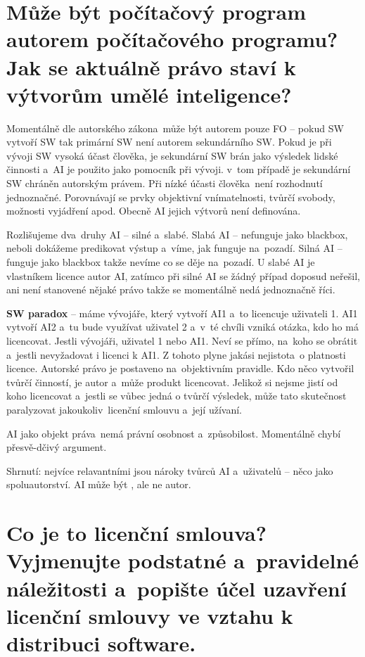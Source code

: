 \section{Může být počítačový program autorem počítačového programu? Jak se aktuálně právo staví k výtvorům umělé inteligence?}

Momentálně dle autorského zákona~může být autorem pouze FO -- pokud SW vytvoří SW tak primární SW není autorem sekundárního SW. Pokud je při vývoji SW vysoká účast člověka, je sekundární SW brán jako výsledek lidské činnosti a~AI je použito jako pomocník při vývoji. v~tom případě je sekundární SW chráněn autorským právem. Při nízké účasti člověka~není rozhodnutí jednoznačné. Porovnávají se prvky objektivní vnímatelnosti, tvůrčí svobody, možnosti vyjádření apod. Obecně AI jejich výtvorů není definována.

Rozlišujeme dva~druhy AI -- silné a~slabé. Slabá AI -- nefunguje jako blackbox, neboli dokážeme predikovat výstup a~víme, jak funguje na~pozadí. Silná AI -- funguje jako blackbox takže nevíme co se děje na~pozadí. U slabé AI je vlastníkem licence autor AI, zatímco při silné AI se žádný případ doposud neřešil, ani není stanovené nějaké právo takže se momentálně nedá jednoznačně říci.

\textbf{SW paradox} -- máme vývojáře, který vytvoří AI1 a~to licencuje uživateli 1. AI1 vytvoří AI2 a~tu bude využívat uživatel 2 a~v~té chvíli vzniká otázka, kdo ho má licencovat. Jestli vývojáři, uživatel 1 nebo AI1. Neví se přímo, na~koho se obrátit a~jestli nevyžadovat i licenci k AI1. Z tohoto plyne jakási nejistota~o platnosti licence. Autorské právo je postaveno na~objektivním pravidle. Kdo něco vytvořil tvůrčí činností, je autor a~může produkt licencovat. Jelikož si nejsme jistí od koho licencovat a~jestli se vůbec jedná o tvůrčí výsledek, může tato skutečnost paralyzovat jakoukoliv~licenční smlouvu a~její užívaní.

AI jako objekt práva~nemá právní osobnost a~způsobilost. Momentálně chybí přesvě-dčivý argument.

Shrnutí: nejvíce relavantními jsou nároky tvůrců AI a~uživatelů -- něco jako spoluautorství. AI může být , ale ne autor.

\newpage
\section{Co je to licenční smlouva? Vyjmenujte podstatné a~pravidelné náležitosti a~popište účel uzavření licenční smlouvy ve vztahu k distribuci software.}

